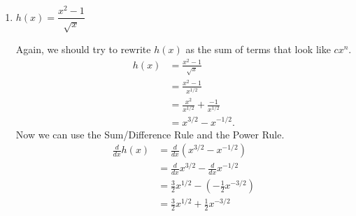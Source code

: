 \documentclass{article}
\begin{document}
\begin{enumerate}[resume]
\begin{enumerate}
      \begin{solution}
      We can anticipate that we might need to use the Power Rule,
      so let's try to rewrite each term in $g(x)$ to look like $cx^n$.
      Remember that $\pi^6$ is a constant, not a variable.
      \begin{align*}
        g(x) = 5x^{-1/3} -\tfrac{1}{4}x^{-1} + x^{5/2} + \pi^6
      \end{align*}
      We can start by using the Sum Rule.
      \begin{align*}
        \frac{d}{dx} g(x) &= \frac{d}{dx} (5x^{-1/3} -\tfrac{1}{4}x^{-1} + x^{5/2} + \pi^6) \\
        &= \frac{d}{dx}(5x^{-1/3}) + \frac{d}{dx}
        (-\tfrac{1}{4}x^{-1}) + \frac{d}{dx} x^{5/2} + \frac{d}{dx} \pi^6 \\
        \intertext{Now we can use the Constant Multiple Rule.}
        &= 5 \frac{d}{dx}x^{-1/3} + (-\tfrac{1}{4}) \frac{d}{dx}
        x^{-1} + \frac{d}{dx} x^{5/2} + \frac{d}{dx} \pi^6 \\
        &= 5 \frac{d}{dx}x^{-1/3} - \tfrac{1}{4} \frac{d}{dx}
        x^{-1} + \frac{d}{dx} x^{5/2} + \frac{d}{dx} \pi^6 \\
        \intertext{Now we can use the Power Rule.}
        &= 5(-\tfrac{1}{3}x^{-4/3}) -\tfrac{1}{4}(-x^{-2}) + \tfrac{5}{2}x^{3/2} + 0 \\
        &= -\tfrac{5}{3} x^{-4/3} + \tfrac{1}{4} x^{-2} + \tfrac{5}{2} x^{3/2}.
      \end{align*}
    \end{solution}

  \item \label{deriv-of-(x^2-1)/sqrt(x)}
    \begin{problem}[0.3in]
      $h(x) = \dfrac{x^2 - 1}{\sqrt{x}}$
    \end{problem}

    \begin{solution}
      Again, we should try to rewrite $h(x)$ as the sum of terms that look like $cx^n$.
      \begin{align*}
        h(x) &= \frac{x^2-1}{\sqrt{x}} \\
        &= \frac{x^2-1}{x^{1/2}} \\
        &= \frac{x^2}{x^{1/2}} + \frac{-1}{x^{1/2}} \\
        &= x^{3/2} - x^{-1/2}. 
      \end{align*}
      Now we can use the Sum/Difference Rule and the Power Rule.
      \begin{align*}
        \frac{d}{dx} h(x) &= \frac{d}{dx} (x^{3/2} - x^{-1/2}) \\
        &= \frac{d}{dx} x^{3/2} - \frac{d}{dx} x^{-1/2} \\
        &= \tfrac{3}{2} x^{1/2} - (-\tfrac{1}{2}x^{-3/2}) \\
        &= \tfrac{3}{2} x^{1/2} + \tfrac{1}{2}x^{-3/2}
      \end{align*}
    \end{solution}




\end{enumerate}
\end{enumerate}
\end{document}
